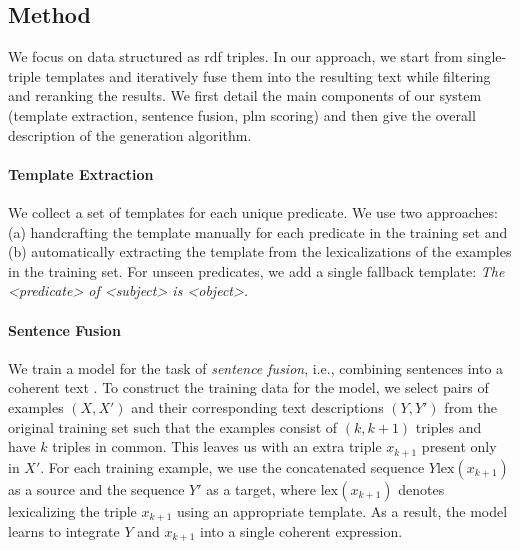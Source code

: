 


\subsection{Method}
\label{sec:text-editing-exp}
We focus on data structured as \ac{rdf} triples. In our approach, we start from single-triple templates and iteratively fuse them into the resulting text while filtering and reranking the results. We first detail the main components of our system (template extraction, sentence fusion, \ac{plm} scoring) and then give the overall description of the generation algorithm.


\paragraph{Template Extraction}
We collect a set of templates for each unique predicate. We use two approaches: (a) handcrafting the template manually for each predicate in the training set and (b) automatically extracting the template from the lexicalizations of the examples in the training set. For unseen predicates, we add a single fallback template: \textit{The <predicate> of <subject> is <object>.}


\paragraph{Sentence Fusion}
We train a model for the task of \emph{sentence fusion}, i.e., combining sentences into a coherent text \cite{barzilay2005sentence}.
To construct the training data for the model, we select pairs of examples $(X, X')$ and their corresponding text descriptions $(Y, Y')$ from the original training set such that the examples consist of $(k, k+1)$ triples and have $k$ triples in common. This leaves us with an extra triple $x_{k+1}$ present only in $X'$. For each training example, we use the concatenated sequence $Y \mathrm{lex}(x_{k+1})$ as a source and the sequence $Y'$ as a target, where $\mathrm{lex}(x_{k+1})$ denotes lexicalizing the triple $x_{k+1}$ using an appropriate template.
As a result, the model learns to integrate $Y$ and $x_{k+1}$ into a single coherent expression.


